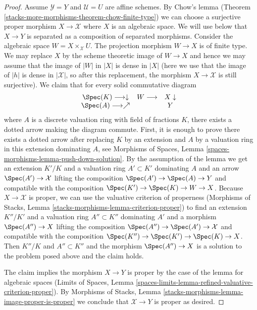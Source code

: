 \begin{proof}
\medskip\noindent
Assume $\mathcal{Y} = Y$ and $\mathcal{U} = U$ are affine schemes.
By Chow's lemma (Theorem \ref{stacks-more-morphisms-theorem-chow-finite-type})
we can choose a surjective proper morphism $X \to \mathcal{X}$
where $X$ is an algebraic space. We will use below that $X \to Y$ is separated
as a composition of separated morphisms. Consider the
algebraic space $W = X \times_\mathcal{X} U$. The projection morphism
$W \to X$ is of finite type.
We may replace $X$ by the scheme theoretic image of
$W \to X$ and hence we may assume that the image of $|W|$ in $|X|$
is dense in $|X|$ (here we use that the image of $|h|$
is dense in $|\mathcal{X}|$, so after this replacement, the
morphism $X \to \mathcal{X}$ is still surjective).
We claim that for every solid commutative diagram
$$
\begin{array}{ccc}\Spec(K) \longrightarrow\downarrow & W \longrightarrow & X \downarrow \\ \Spec(A) \longrightarrow\nearrow &  & Y\end{array}
$$
where $A$ is a discrete valuation ring with field of fractions $K$, there
exists a dotted arrow making the diagram commute. First, it is enough to
prove there exists a dotted arrow after replacing $K$ by an extension
and $A$ by a valuation ring in this extension dominating $A$, see
Morphisms of Spaces, Lemma \ref{spaces-morphisms-lemma-push-down-solution}.
By the assumption of the lemma we get an extension $K'/K$ and a valuation
ring $A' \subset K'$ dominating $A$ and
an arrow $\Spec(A') \to \mathcal{X}$ lifting the composition
$\Spec(A') \to \Spec(A) \to Y$ and compatible with the composition
$\Spec(K') \to \Spec(K) \to W \to X$. Because $X \to \mathcal{X}$
is proper, we can use the valuative criterion of properness
(Morphisms of Stacks, Lemma \ref{stacks-morphisms-lemma-criterion-proper})
to find an extension $K''/K'$ and a valuation ring $A'' \subset K''$
dominating $A'$ and a morphism $\Spec(A'') \to X$ lifting the composition
$\Spec(A'') \to \Spec(A') \to \mathcal{X}$ and compatible with the composition
$\Spec(K'') \to \Spec(K') \to \Spec(K) \to X$.
Then $K''/K$ and $A'' \subset K''$ and the morphism $\Spec(A'') \to X$
is a solution to the problem posed above and the claim holds.

\medskip\noindent
The claim implies the morphism $X \to Y$ is proper by the
case of the lemma for algebraic spaces
(Limits of Spaces, Lemma
\ref{spaces-limits-lemma-refined-valuative-criterion-proper}).
By Morphisms of Stacks, Lemma
\ref{stacks-morphisms-lemma-image-proper-is-proper}
we conclude that $\mathcal{X} \to Y$ is proper as desired.
\end{proof}

